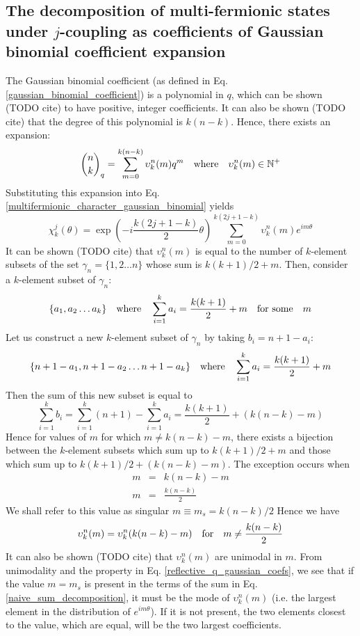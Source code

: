 \documentclass[12pt]{article}
\begin{document}
	\subsection{The decomposition of multi-fermionic states under $j$-coupling as coefficients of Gaussian binomial coefficient expansion}
	The Gaussian binomial coefficient (as defined in Eq. \ref{gaussian_binomial_coefficient}) is a polynomial in $q$, which can be shown (TODO cite) to have positive, integer coefficients. It can also be shown (TODO cite) that the degree of this polynomial is $k(n-k)$. Hence, there exists an expansion:
	\begin{equation}
	{n\choose k}_q=\sum_{m=0}^{k(n-k)} \upsilon^n_k(m) q^m\qq{where} \upsilon^n_k(m)\in\mathbb{N}^+
	\end{equation}
	Substituting this expansion into Eq. \ref{multifermionic_character_gaussian_binomial} yields
	\begin{equation} \label{naive_sum_decomposition}
	\chi^j_k(\theta) = \exp(-i\frac{k(2j+1-k)}{2}\theta)\sum_{m=0}^{k(2j+1-k)} \upsilon^n_k(m) e^{im\theta}
	\end{equation}
	It can be shown (TODO cite) that $\upsilon^n_k(m)$ is equal to the number of $k$-element subsets of the set $\gamma_n=\{1, 2\dots n\}$ whose sum is $k(k+1)/2+m$. Then, consider a $k$-element subset of $\gamma_n$:
	$$\{a_1, a_2\dots a_k\}\qq{where} \sum_{i=1}^k a_i = \frac{k(k+1)}{2} + m \qq{for some} m$$
	Let us construct a new $k$-element subset of $\gamma_n$ by taking $b_i=n+1-a_i$:
	$$\{n+1-a_1, n+1-a_2\dots n+1-a_k\}\qq{where} \sum_{i=1}^k a_i = \frac{k(k+1)}{2} + m$$
	Then the sum of this new subset is equal to
	\begin{equation}
	\sum_{i=1}^k b_i = \sum_{i=1}^k (n+1) - \sum_{i=1}^k a_i = \frac{k(k+1)}{2}+(k(n-k)-m)
	\end{equation}
	Hence for values of $m$ for which $m\neq k(n-k)-m$, there exists a bijection between the $k$-element subsets which sum up to $k(k+1)/2+m$ and those which sum up to $k(k+1)/2+(k(n-k)-m)$. The exception occurs when
	\begin{eqnarray}
	m &=& k(n-k)-m\\
	m &=& \frac{k(n-k)}{2}
	\end{eqnarray}
	We shall refer to this value as singular $m\equiv m_s = k(n-k)/2$
	Hence we have
	\begin{equation} \label{reflective_q_gaussian_coefs}
	\upsilon^n_k(m) = \upsilon^n_k(k(n-k)-m) \qq{for} m\neq \frac{k(n-k)}{2}
	\end{equation}
	It can also be shown (TODO cite) that $\upsilon^n_k(m)$ are unimodal in $m$. From unimodality and the property in Eq. \ref{reflective_q_gaussian_coefs}, we see that if the value $m=m_s$ is present in the terms of the sum in Eq. \ref{naive_sum_decomposition}, it must be the mode of $\upsilon^n_k(m)$ (i.e. the largest element in the distribution of $e^{im\theta}$). If it is not present, the two elements closest to the value, which are equal, will be the two largest coefficients.
	
\end{document}
